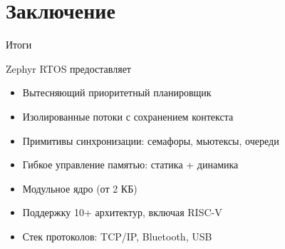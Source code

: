\documentclass[12pt,aspectratio=169]{beamer}
\begin{document}

\section{Заключение}

\begin{frame}{Итоги}
\begin{block}{Zephyr RTOS предоставляет}
\begin{itemize}
  \item Вытесняющий приоритетный планировщик
  \item Изолированные потоки с сохранением контекста
  \item Примитивы синхронизации: семафоры, мьютексы, очереди
  \item Гибкое управление памятью: статика + динамика
  \item Модульное ядро (от 2 КБ)
  \item Поддержку 10+ архитектур, включая RISC-V
  \item Стек протоколов: TCP/IP, Bluetooth, USB
\end{itemize}
\end{block}

\vspace{4pt}
\begin{center}
\end{center}
\end{frame}
\end{document}

